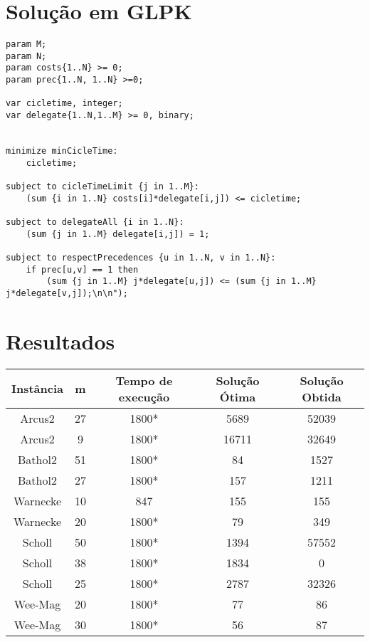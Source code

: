 \documentclass{report}
\begin{document}
\section{Solução em GLPK}

\begin{lstlisting}
param M;
param N;
param costs{1..N} >= 0;
param prec{1..N, 1..N} >=0;

var cicletime, integer;
var delegate{1..N,1..M} >= 0, binary;


minimize minCicleTime:
	cicletime;

subject to cicleTimeLimit {j in 1..M}:
	(sum {i in 1..N} costs[i]*delegate[i,j]) <= cicletime;

subject to delegateAll {i in 1..N}:
	(sum {j in 1..M} delegate[i,j]) = 1;

subject to respectPrecedences {u in 1..N, v in 1..N}:
	if prec[u,v] == 1 then
		(sum {j in 1..M} j*delegate[u,j]) <= (sum {j in 1..M} j*delegate[v,j]);\n\n");
\end{lstlisting}

\section{Resultados}

\begin{table}[htbp]
 \begin{tabular}{|c|c|c|c|c|}
  \hline
  \textbf{Instância} & \textbf{m} & \textbf{Tempo de execução} & \textbf{Solução Ótima} & \textbf{Solução Obtida} \\
  \hline
  Arcus2 & 27 & 1800* & 5689  & 52039 \\
  \hline
  Arcus2 & 9 & 1800* & 16711 & 32649 \\
  \hline
  Bathol2 & 51 & 1800* & 84 & 1527 \\
  \hline
  Bathol2 & 27 & 1800* & 157 & 1211 \\
  \hline
  Warnecke & 10 & 847 & 155 & 155 \\
  \hline
  Warnecke & 20 & 1800* & 79 & 349 \\
  \hline
  Scholl & 50 & 1800* & 1394 & 57552 \\
  \hline
  Scholl & 38 & 1800* & 1834 & 0 \\
  \hline
  Scholl & 25 & 1800* & 2787 & 32326 \\
  \hline
  Wee-Mag & 20 & 1800* & 77 & 86 \\
  \hline
  Wee-Mag & 30 & 1800* & 56 & 87 \\
  \hline
 \end{tabular}
\end{table}
\end{document}
